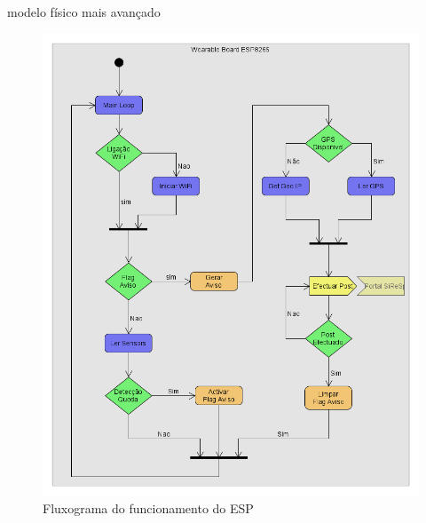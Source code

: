 modelo físico mais avançado

\begin{figure}[!htb]
	\centering
	\includegraphics[width=\textwidth]{figuras/fluxograma_ESP.png}
	\caption{Fluxograma do funcionamento do ESP}
	\label{fig:fluxograma_ESP}
\end{figure}

